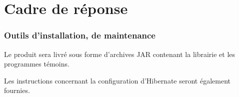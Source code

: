 \section{Cadre de réponse}





%

\subsubsection{Outils d’installation, de maintenance}

Le produit sera livré sous forme d'archives JAR contenant la librairie et les programmes témoins.

Les instructions concernant la configuration d'Hibernate seront également fournies.


